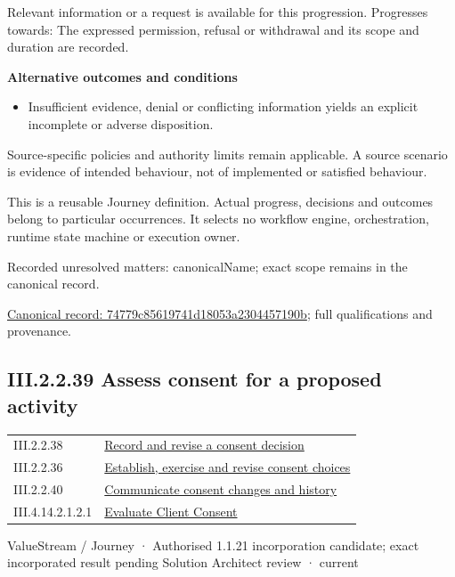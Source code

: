 Relevant information or a request is available for this progression. Progresses towards: The expressed permission, refusal or withdrawal and its scope and duration are recorded.



\par\medskip\textbf{Alternative outcomes and conditions}\par


\begin{itemize}


\item Insufficient evidence, denial or conflicting information yields an explicit incomplete or adverse disposition.

\end{itemize}


Source-specific policies and authority limits remain applicable. A source scenario is evidence of intended behaviour, not of implemented or satisfied behaviour.



This is a reusable Journey definition. Actual progress, decisions and outcomes belong to particular occurrences. It selects no workflow engine, orchestration, runtime state machine or execution owner.


{\small Recorded unresolved matters: canonicalName; exact scope remains in the canonical record.}\par
{\footnotesize \href{../../../../continuum/strategy/value-stream/74779c85619741d18053a2304457190b.md}{Canonical record: 74779c85619741d18053a2304457190b}; full qualifications and provenance.}\par
\subsection*{III.2.2.39 Assess consent for a proposed activity}
\label{navigation:III.2.2.39}

\begin{longtable}{p{.22\linewidth}p{.73\linewidth}}
III.2.2.38 & \hyperref[element:74779c85619741d18053a2304457190b]{Record and revise a consent decision} \\
III.2.2.36 & \hyperref[element:850bba32295c4e53b20036b80f77f491]{Establish, exercise and revise consent choices} \\
III.2.2.40 & \hyperref[element:9356b876f2aa427f989ad4f1b7f2fa4c]{Communicate consent changes and history} \\
III.4.14.2.1.2.1 & \hyperref[element:b9e978a651cf4ff3bb690af50b8528cd]{Evaluate Client Consent} \\
\end{longtable}
\label{element:17c66eb17d6040d09e250e787be71719}
{\small ValueStream / Journey · Authorised 1.1.21 incorporation candidate; exact incorporated result pending Solution Architect review · current}\par

